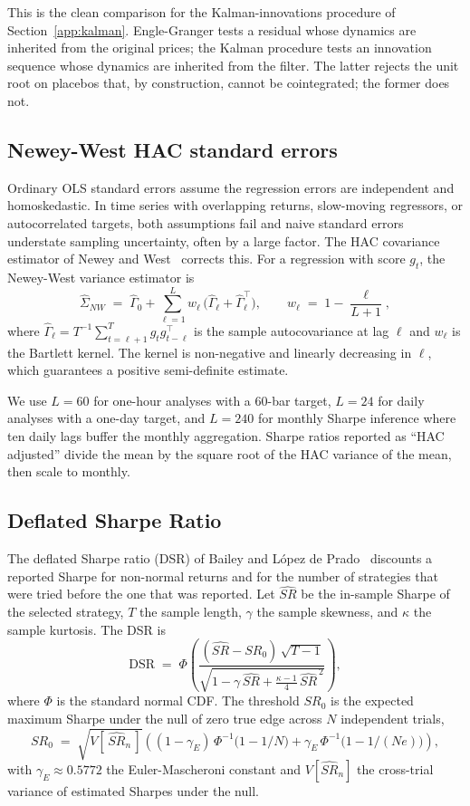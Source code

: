 \documentclass[11pt]{article}
\begin{document}
This is the clean comparison for the Kalman-innovations procedure of
Section~\ref{app:kalman}. Engle-Granger tests a residual whose dynamics are inherited from
the original prices; the Kalman procedure tests an innovation sequence whose dynamics are
inherited from the filter. The latter rejects the unit root on placebos that, by
construction, cannot be cointegrated; the former does not.

\subsection{Newey-West HAC standard errors}
\label{app:hac}

Ordinary OLS standard errors assume the regression errors are independent and
homoskedastic. In time series with overlapping returns, slow-moving regressors, or
autocorrelated targets, both assumptions fail and naive standard errors understate sampling
uncertainty, often by a large factor. The HAC covariance estimator of
Newey and West~\cite{newey1987hac} corrects this. For a regression with score $g_t$, the
Newey-West variance estimator is
\[
\hat{\Sigma}_{NW} \;=\; \hat{\Gamma}_0 + \sum_{\ell = 1}^{L} w_\ell \, \big( \hat{\Gamma}_\ell + \hat{\Gamma}_\ell^\top \big),
\qquad
w_\ell \;=\; 1 - \frac{\ell}{L+1},
\]
where $\hat{\Gamma}_\ell = T^{-1} \sum_{t = \ell+1}^{T} g_t g_{t-\ell}^\top$ is the sample
autocovariance at lag $\ell$ and $w_\ell$ is the Bartlett kernel. The kernel is
non-negative and linearly decreasing in $\ell$, which guarantees a positive semi-definite
estimate.

We use $L = 60$ for one-hour analyses with a 60-bar target, $L = 24$ for daily analyses
with a one-day target, and $L = 240$ for monthly Sharpe inference where ten daily lags
buffer the monthly aggregation. Sharpe ratios reported as ``HAC adjusted'' divide the mean
by the square root of the HAC variance of the mean, then scale to monthly.

\subsection{Deflated Sharpe Ratio}
\label{app:dsr}

The deflated Sharpe ratio (DSR) of Bailey and L\'opez de Prado~\cite{bailey2014dsr}
discounts a reported Sharpe for non-normal returns and for the number of strategies that
were tried before the one that was reported. Let $\widehat{SR}$ be the in-sample Sharpe of
the selected strategy, $T$ the sample length, $\gamma$ the sample skewness, and $\kappa$
the sample kurtosis. The DSR is
\[
\mathrm{DSR} \;=\; \Phi\!\left( \frac{ (\widehat{SR} - SR_0) \, \sqrt{T - 1} }
    { \sqrt{1 - \gamma \, \widehat{SR} + \tfrac{\kappa - 1}{4} \, \widehat{SR}^{\,2} } } \right),
\]
where $\Phi$ is the standard normal CDF. The threshold $SR_0$ is the expected maximum
Sharpe under the null of zero true edge across $N$ independent trials,
\[
SR_0 \;=\; \sqrt{V[\,\widehat{SR}_n\,]} \left( (1 - \gamma_E) \, \Phi^{-1}\!\big(1 - 1/N\big)
    + \gamma_E \, \Phi^{-1}\!\big(1 - 1/(N e)\big) \right),
\]
with $\gamma_E \approx 0.5772$ the Euler-Mascheroni constant and $V[\widehat{SR}_n]$ the
cross-trial variance of estimated Sharpes under the null.
\end{document}
